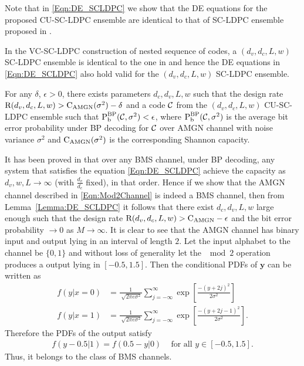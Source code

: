 \documentclass[journal,twocolumn]{IEEEtran}
\begin{document}
Note that in \eqref{Eqn:DE_SCLDPC} we show that the DE equations for the proposed CU-SC-LDPC ensemble are identical to that of SC-LDPC ensemble proposed in \cite{KudekarUrbanke11,kudekaruniversal}.
\begin{Remark}\label{Rmk:Same_DE}
In the VC-SC-LDPC construction of nested sequence of codes, a $(d_{v},d_{c},L,w)$ SC-LDPC ensemble is identical to the one in \cite{kudekaruniversal} and hence the DE equations in \eqref{Eqn:DE_SCLDPC} also hold valid for the $(d_{v},d_{c},L,w)$ SC-LDPC ensemble.
\end{Remark}

\begin{lemma}\label{Lemma:BMSProof1}
For any $\delta$, $\epsilon>0$, there exists parameters $d_{c},d_{v},L,w$ such that the design rate $\text{R}(d_{v},d_{c},L,w)>\text{C}_{\text{AMGN}}(\sigma^{2})-\delta$ and a code $\mathcal{C}$ from the  $(d_{v},d_{c},L,w)$ CU-SC-LDPC  ensemble such that $\text{P}_{\text{b}}^{\text{BP}}(\mathcal{C},\sigma^{2})< \epsilon$, where $\text{P}_{\text{b}}^{\text{BP}}(\mathcal{C},\sigma^{2})$ is the average bit error probability under BP decoding for $\mathcal{C}$ over AMGN channel with noise variance $\sigma^{2}$ and $\text{C}_{\text{AMGN}}(\sigma^{2})$ is the corresponding Shannon capacity.
\end{lemma}
\begin{IEEEproof}
It has been proved in \cite{kudekaruniversal,kumar2012proof} that over any BMS channel, under BP decoding, any system that satisfies the equation \eqref{Eqn:DE_SCLDPC} achieve the capacity as $d_{v},w,L \rightarrow \infty$ (with $\frac{d_{v}}{d_{c}}$ fixed), in that order. Hence if we show that the AMGN channel described in \eqref{Eqn:Mod2Channel} is indeed a BMS channel, then from Lemma~\ref{Lemma:DE_SCLDPC} it follows that there exist $d_{c},d_{v},L,w$ large enough such that the design rate $\text{R}(d_{v},d_{c},L,w)>\text{C}_{\text{AMGN}}-\epsilon$ and the bit error probability $\rightarrow 0$  as $M\rightarrow \infty$. It is clear to see that the AMGN channel has binary input and output lying in an interval of length $2$. Let the input alphabet to the channel be $\{0,1\}$ and without loss of generality let the $\mod 2$ operation produces a output lying in $[-0.5,  1.5]$. Then the conditional PDFs of $\mathbf{y}$ can be written as
\begin{align}
f(y|x=0)&=\frac{1}{\sqrt[]{2\pi e\sigma^{2}}}\sum_{j=-\infty}^{\infty}\exp\left[\frac{ -(y+2j)^{2}}{2\sigma^{2}}\right]\\
f(y|x=1)&=\frac{1}{\sqrt[]{2\pi e\sigma^{2}}}\sum_{j=-\infty}^{\infty}\exp\left[\frac{ -(y+2j-1)^{2}}{2\sigma^{2}}\right].
\end{align}
Therefore the PDFs of the output satisfy
\begin{align*}
f(y-0.5|1)=f(0.5-y|0) \hspace{10pt} \text{ for all } y\in [-0.5, 1.5].
\end{align*}
Thus, it belongs to the class of BMS channels.
\end{IEEEproof}
\end{document}
